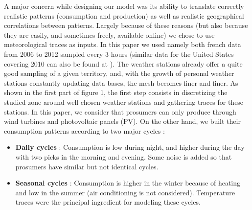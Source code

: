 \documentclass[conference]{IEEEtran}
\begin{document}
A major concern while designing our model was its ability to translate correctly realistic patterns (consumption and production) as well as realistic geographical correlations between patterns. Largely because of these reasons (but also because they are easily, and sometimes freely, available online) we chose to use meteorological traces as inputs. In this paper we used namely both french data from 2006 to 2012 sampled every 3 hours \cite{Infoclimat} (similar data for the United States covering 2010 can also be found at \cite{NCDC}). The weather stations already offer a quite good sampling of a given territory, and, with the growth of personal weather stations constantly updating data bases, the mesh becomes finer and finer. As shown in the first part of figure 1, the first step consists in discretizing the studied zone around well chosen weather stations and gathering traces for these stations. In this paper, we consider that prosumers can only produce through wind turbines and photovoltaic panels (PV). On the other hand, we built their consumption patterns according to two major cycles :
\begin{itemize}
\item \textbf{Daily cycles} : Consumption is low during night, and higher during the day with two picks in the morning and evening. Some noise is added so that prosumers have similar but not identical cycles.
\item \textbf{Seasonal cycles} : Consumption is higher in the winter because of heating and low in the summer (air conditioning is not considered). Temperature traces were the principal ingredient for modeling these cycles.
\end{itemize} 
\end{document}
